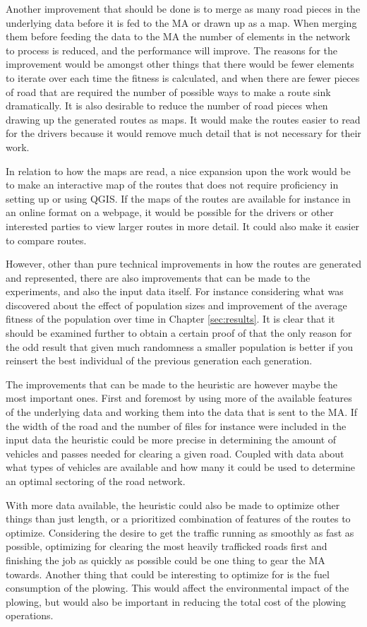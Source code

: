 Another improvement that should be done is to merge as many road pieces in the underlying data before it is fed to the MA or drawn up as a map. When merging them before feeding the data to the MA the number of elements in the network to process is reduced, and the performance will improve. The reasons for the improvement would be amongst other things that there would be fewer elements to iterate over each time the fitness is calculated, and when there are fewer pieces of road that are required the number of possible ways to make a route sink dramatically. It is also desirable to reduce the number of road pieces when drawing up the generated routes as maps. It would make the routes easier to read for the drivers because it would remove much detail that is not necessary for their work.

In relation to how the maps are read, a nice expansion upon the work would be to make an interactive map of the routes that does not require proficiency in setting up or using QGIS. If the maps of the routes are available for instance in an online format on a webpage, it would be possible for the drivers or other interested parties to view larger routes in more detail. It could also make it easier to compare routes.

However, other than pure technical improvements in how the routes are generated and represented, there are also improvements that can be made to the experiments, and also the input data itself. For instance considering what was discovered about the effect of population sizes and improvement of the average fitness of the population over time in Chapter \ref{sec:results}. It is clear that it should be examined further to obtain a certain proof of that the only reason for the odd result that given much randomness a smaller population is better if you reinsert the best individual of the previous generation each generation.

The improvements that can be made to the heuristic are however maybe the most important ones. First and foremost by using more of the available features of the underlying data and working them into the data that is sent to the MA. If the width of the road and the number of files for instance were included in the input data the heuristic could be more precise in determining the amount of vehicles and passes needed for clearing a given road. Coupled with data about what types of vehicles are available and how many it could be used to determine an optimal sectoring of the road network.

With more data available, the heuristic could also be made to optimize other things than just length, or a prioritized combination of features of the routes to optimize. Considering the desire to get the traffic running as smoothly as fast as possible, optimizing for clearing the most heavily trafficked roads first and finishing the job as quickly as possible could be one thing to gear the MA towards. Another thing that could be interesting to optimize for is the fuel consumption of the plowing. This would affect the environmental impact of the plowing, but would also be important in reducing the total cost of the plowing operations.

